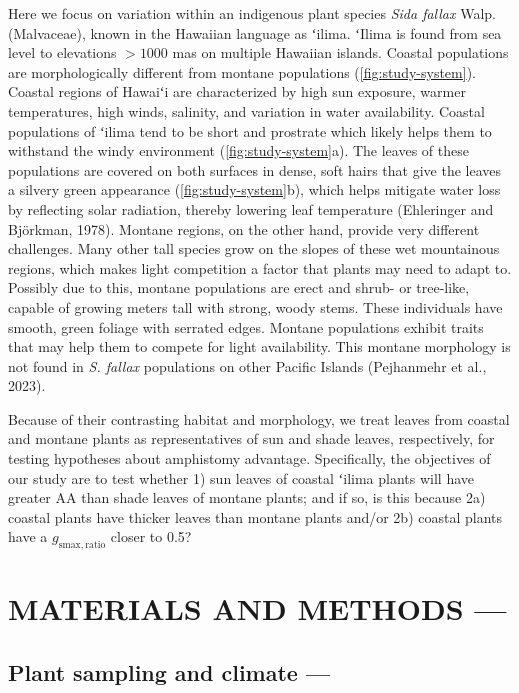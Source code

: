 \documentclass[
  letterpaper,
  DIV=11,
  numbers=noendperiod]{scrartcl}
\begin{document}
Here we focus on variation within an indigenous plant species \emph{Sida
fallax} Walp. (Malvaceae), known in the Hawaiian language as ʻilima.
ʻIlima is found from sea level to elevations \(>1000\) mas on multiple
Hawaiian islands. Coastal populations are morphologically different from
montane populations (\autoref{fig:study-system}). Coastal regions of
Hawaiʻi are characterized by high sun exposure, warmer temperatures,
high winds, salinity, and variation in water availability. Coastal
populations of ʻilima tend to be short and prostrate which likely helps
them to withstand the windy environment (\autoref{fig:study-system}a).
The leaves of these populations are covered on both surfaces in dense,
soft hairs that give the leaves a silvery green appearance
(\autoref{fig:study-system}b), which helps mitigate water loss by
reflecting solar radiation, thereby lowering leaf temperature
(Ehleringer and Björkman, 1978). Montane regions, on the other hand,
provide very different challenges. Many other tall species grow on the
slopes of these wet mountainous regions, which makes light competition a
factor that plants may need to adapt to. Possibly due to this, montane
populations are erect and shrub- or tree-like, capable of growing meters
tall with strong, woody stems. These individuals have smooth, green
foliage with serrated edges. Montane populations exhibit traits that may
help them to compete for light availability. This montane morphology is
not found in \emph{S. fallax} populations on other Pacific Islands
(Pejhanmehr et al., 2023).

Because of their contrasting habitat and morphology, we treat leaves
from coastal and montane plants as representatives of sun and shade
leaves, respectively, for testing hypotheses about amphistomy advantage.
Specifically, the objectives of our study are to test whether 1) sun
leaves of coastal ʻilima plants will have greater \(\mathrm{AA}\) than
shade leaves of montane plants; and if so, is this because 2a) coastal
plants have thicker leaves than montane plants and/or 2b) coastal plants
have a \(g_{\mathrm{smax,ratio}}\) closer to 0.5?

\hypertarget{methods}{%
\section{MATERIALS AND METHODS ---}\label{methods}}

\hypertarget{plant-sampling}{%
\subsection{Plant sampling and climate ---}\label{plant-sampling}}
\end{document}
